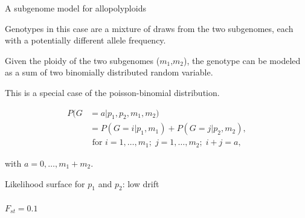 \documentclass[presentation,sansserif]{beamer}
\begin{document}
\begin{frame}[t]{A subgenome model for allopolyploids}

Genotypes in this case are a mixture of draws from the two subgenomes, each with a potentially different allele frequency.
\vspace{0.25in}
\pause

Given the ploidy of the two subgenomes ($m_1$,$m_2$), the genotype can be modeled as a sum of two binomially distributed random variable.
\vspace{0.25in}
\pause

This is a special case of the poisson-binomial distribution.
\pause

\begin{align}
P(G&=a|p_1,p_2,m_1,m_2) \nonumber \\[0.05in]
&= P(G=i|p_1,m_1) + P(G=j|p_2,m_2), \nonumber \\[0.05in]
&\text{ for } i=1,\dots,m_1; \; j=1,\ldots,m_2; \; i+j=a,
\end{align}

\vspace{-0.1in}
with $a = 0,\dots,m_1+m_2$.

\end{frame}

{  %
\begin{frame}[c,plain]{Likelihood surface for $p_1$ and $p_2$: low drift}

	\framesubtitle{$F_{st}=0.1$}
	\pause
	\begin{center}
	\end{center}
\end{frame}
}
\end{document}
